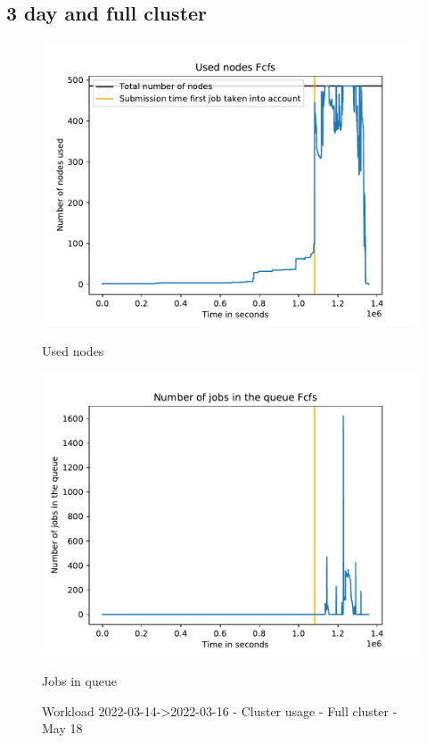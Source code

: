\documentclass[a4paper]{article}
\begin{document}
	\subsection{3 day and full cluster}
	\begin{figure}[H]\begin{minipage}[b]{0.5\linewidth}\centering\includegraphics[width=1\linewidth]{MBSS/plot/2022-03-14->2022-03-16_Fcfs_Used_nodes_450_128_32_256_4_1024.pdf}\caption{Used nodes}\vspace{4ex}\end{minipage}%
	\begin{minipage}[b]{0.5\linewidth}\centering\includegraphics[width=1\linewidth]{MBSS/plot/2022-03-14->2022-03-16_Fcfs_Nb_scheduled_jobs_450_128_32_256_4_1024.pdf}\caption{Jobs in queue}\vspace{4ex}\end{minipage}\caption{Workload 2022-03-14->2022-03-16 - Cluster usage - Full cluster - May 18}\end{figure}
\end{document}
